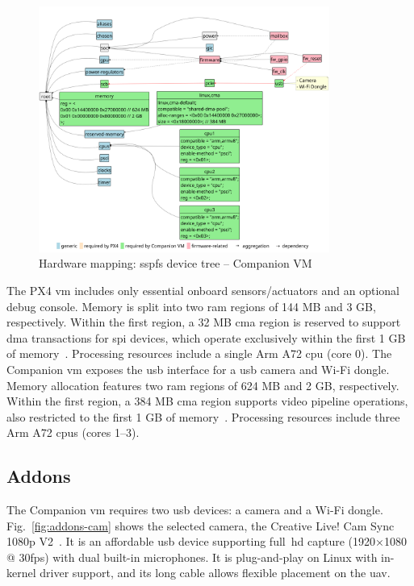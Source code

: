\begin{figure}[!hbt]
  \centering
  \includegraphics[width=0.85\textwidth]{./img/pdf/hw-map-3} 
  \caption[Hardware mapping: SSPFS device tree -- Companion VM]{Hardware
    mapping: \gls{sspfs} device tree -- Companion VM}%
  \label{fig:hw-map-3}
\end{figure}

%
The PX4 \gls{vm} includes only essential onboard
sensors/actuators and an optional debug console.
Memory is split into two \gls{ram} regions of 144 MB and 3 GB, respectively. Within the first region, a 32 MB
\gls{cma} region is reserved to support \gls{dma} transactions for \gls{spi}
devices, which operate exclusively within the first 1 GB of
memory~\cite{bcm2711peripherals}. Processing resources include a single Arm A72
\gls{cpu} (core 0).
%
The Companion \gls{vm} exposes the \gls{usb} interface for a \gls{usb} camera and Wi-Fi dongle. Memory allocation features two
\gls{ram} regions of 624 MB and 2 GB, respectively. Within the first region, a
384 MB \gls{cma} region supports video pipeline operations, also restricted to the first 1
GB of memory~\cite{bcm2711peripherals}. Processing resources include three Arm
A72 \glspl{cpu} (cores 1--3).

\subsection{Addons}
\label{sec:addons}
The Companion \gls{vm} requires two \gls{usb} devices: a camera and a Wi-Fi
dongle. Fig.~\ref{fig:addons-cam} shows the selected camera, the Creative Live!
Cam Sync 1080p V2~\cite{creative-cam}. It is an affordable \gls{usb} device
supporting full~\gls{hd} capture  (1920×1080 @ 30\gls{fps}) with dual built-in
microphones. It is plug-and-play on Linux with in-kernel driver support, and its
long cable allows flexible placement on the \gls{uav}.

